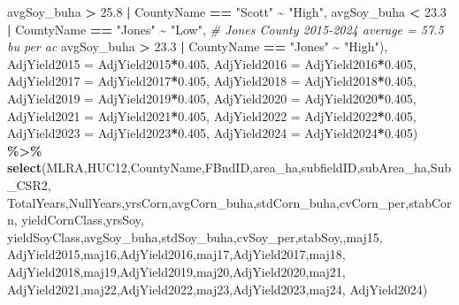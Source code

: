 \documentclass[
]{article}
\newenvironment{Shaded}{\begin{snugshade}}{\end{snugshade}}
\newcommand{\AttributeTok}[1]{\textcolor[rgb]{0.13,0.29,0.53}{#1}}
\newcommand{\CommentTok}[1]{\textcolor[rgb]{0.56,0.35,0.01}{\textit{#1}}}
\newcommand{\FloatTok}[1]{\textcolor[rgb]{0.00,0.00,0.81}{#1}}
\newcommand{\FunctionTok}[1]{\textcolor[rgb]{0.13,0.29,0.53}{\textbf{#1}}}
\newcommand{\NormalTok}[1]{#1}
\newcommand{\SpecialCharTok}[1]{\textcolor[rgb]{0.81,0.36,0.00}{\textbf{#1}}}
\newcommand{\StringTok}[1]{\textcolor[rgb]{0.31,0.60,0.02}{#1}}
\begin{document}
\begin{Shaded}
\begin{Highlighting}[]
\NormalTok{                                    avgSoy\_buha }\SpecialCharTok{\textgreater{}} \FloatTok{25.8} \SpecialCharTok{|}\NormalTok{ CountyName }\SpecialCharTok{==} \StringTok{"Scott"} \SpecialCharTok{\textasciitilde{}} \StringTok{"High"}\NormalTok{,}
\NormalTok{                                    avgSoy\_buha }\SpecialCharTok{\textless{}} \FloatTok{23.3} \SpecialCharTok{|}\NormalTok{ CountyName }\SpecialCharTok{==} \StringTok{"Jones"} \SpecialCharTok{\textasciitilde{}} \StringTok{"Low"}\NormalTok{, }\CommentTok{\# Jones County 2015{-}2024 average = 57.5 bu per ac}
\NormalTok{                                    avgSoy\_buha }\SpecialCharTok{\textgreater{}} \FloatTok{23.3} \SpecialCharTok{|}\NormalTok{ CountyName }\SpecialCharTok{==} \StringTok{"Jones"} \SpecialCharTok{\textasciitilde{}} \StringTok{"High"}\NormalTok{),}
         \AttributeTok{AdjYield2015 =}\NormalTok{ AdjYield2015}\SpecialCharTok{*}\FloatTok{0.405}\NormalTok{,}
         \AttributeTok{AdjYield2016 =}\NormalTok{ AdjYield2016}\SpecialCharTok{*}\FloatTok{0.405}\NormalTok{,}
         \AttributeTok{AdjYield2017 =}\NormalTok{ AdjYield2017}\SpecialCharTok{*}\FloatTok{0.405}\NormalTok{,}
         \AttributeTok{AdjYield2018 =}\NormalTok{ AdjYield2018}\SpecialCharTok{*}\FloatTok{0.405}\NormalTok{,}
         \AttributeTok{AdjYield2019 =}\NormalTok{ AdjYield2019}\SpecialCharTok{*}\FloatTok{0.405}\NormalTok{,}
         \AttributeTok{AdjYield2020 =}\NormalTok{ AdjYield2020}\SpecialCharTok{*}\FloatTok{0.405}\NormalTok{,}
         \AttributeTok{AdjYield2021 =}\NormalTok{ AdjYield2021}\SpecialCharTok{*}\FloatTok{0.405}\NormalTok{,}
         \AttributeTok{AdjYield2022 =}\NormalTok{ AdjYield2022}\SpecialCharTok{*}\FloatTok{0.405}\NormalTok{,}
         \AttributeTok{AdjYield2023 =}\NormalTok{ AdjYield2023}\SpecialCharTok{*}\FloatTok{0.405}\NormalTok{,}
         \AttributeTok{AdjYield2024 =}\NormalTok{ AdjYield2024}\SpecialCharTok{*}\FloatTok{0.405}\NormalTok{) }\SpecialCharTok{\%\textgreater{}\%}
  \FunctionTok{select}\NormalTok{(MLRA,HUC12,CountyName,FBndID,area\_ha,subfieldID,subArea\_ha,Sub\_CSR2,}
\NormalTok{         TotalYears,NullYears,yrsCorn,avgCorn\_buha,stdCorn\_buha,cvCorn\_per,stabCorn,}
\NormalTok{         yieldCornClass,yrsSoy,}
\NormalTok{         yieldSoyClass,avgSoy\_buha,stdSoy\_buha,cvSoy\_per,stabSoy,,maj15,}
\NormalTok{         AdjYield2015,maj16,AdjYield2016,maj17,AdjYield2017,maj18,}
\NormalTok{         AdjYield2018,maj19,AdjYield2019,maj20,AdjYield2020,maj21,}
\NormalTok{         AdjYield2021,maj22,AdjYield2022,maj23,AdjYield2023,maj24,}
\NormalTok{         AdjYield2024)}
\end{Highlighting}
\end{Shaded}
\end{document}
